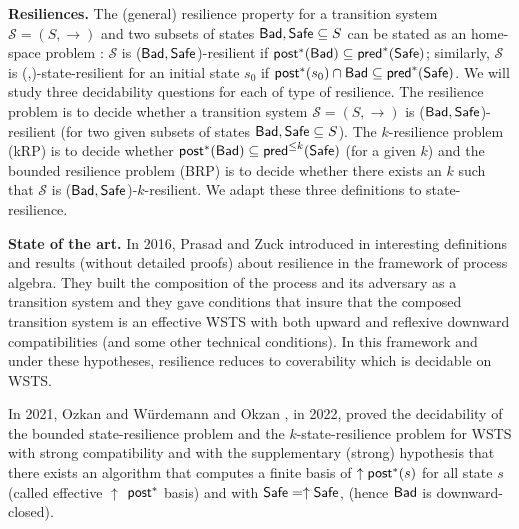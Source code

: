 {\bf Resiliences.}  
The (general) resilience property for a transition system $\mathscr{S} = (S,\rightarrow )$ and two subsets of states $\textsf{Bad},\textsf{Safe} \subseteq S$ can be stated as an home-space problem : $\mathscr{S}$ is ($\textsf{Bad},\textsf{Safe}$)-resilient if $\textsf{post}^*(\textsf{Bad}) \subseteq \textsf{pred}^*(\textsf{Safe})$; 
similarly, $\mathscr{S}$ is (\Bad,\Safe)-state-resilient for an initial state $s_0$ if $\textsf{post}^*(s_0) \cap \textsf{Bad} \subseteq \textsf{pred}^*(\textsf{Safe})$.
We will study three decidability questions for each of type of resilience.
The resilience problem is to decide whether a transition system $\mathscr{S} = (S,\rightarrow )$ is ($\textsf{Bad},\textsf{Safe}$)-resilient (for two given subsets of states $\textsf{Bad},\textsf{Safe} \subseteq S$).
The $k$-resilience problem (kRP) is to decide whether $\textsf{post}^*(\textsf{Bad}) \subseteq \textsf{pred}^{\leq k}(\textsf{Safe})$ (for a given $k$) and 
the bounded resilience problem (BRP) is to decide whether there exists an $k$ such that $\mathscr{S}$ is ($\textsf{Bad},\textsf{Safe}$)-$k$-resilient. We adapt these three definitions to state-resilience.


{\bf State of the art.}
In 2016, Prasad and Zuck introduced in  \cite{DBLP:journals/corr/PrasadZ16} interesting definitions and results (without detailed proofs) about resilience in the framework of process algebra. They built the composition of the process and its adversary as a transition system and they gave conditions that insure that the composed transition system is an effective WSTS with both upward and reflexive downward compatibilities (and some other technical conditions). In this framework and under these hypotheses, resilience reduces to coverability which is decidable on WSTS. 

In 2021, Ozkan and Würdemann  \cite{DBLP:journals/corr/abs-2108-00889} and Okzan \cite{DBLP:conf/gg/Ozkan22}, in 2022, proved the decidability of the bounded state-resilience problem and the $k$-state-resilience problem for WSTS  with strong compatibility and with the supplementary (strong) hypothesis that there exists an algorithm that computes a finite basis of $\uparrow \textsf{post}^*(s)$ for all state $s$ (called effective 
$\uparrow$ $\textsf{post}^*$ basis) and with $\textsf{Safe}=\uparrow \textsf{Safe}$, (hence $\textsf{Bad}$ is downward-closed).

